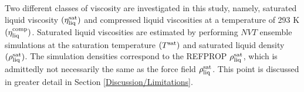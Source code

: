 \documentclass[preprint,review,12pt]{elsarticle}
\begin{document}
	
	
	
%	
	
	
		
	Two different classes of viscosity are investigated in this study, namely, saturated liquid viscosity $(\eta_{\rm liq}^{\rm sat})$ and compressed liquid viscosities at a temperature of 293 K $(\eta_{\rm liq}^{\rm comp})$. Saturated liquid viscosities are estimated by performing $NVT$ ensemble simulations at the saturation temperature $(T^{\rm sat})$ and saturated liquid density $(\rho_{\rm liq}^{\rm sat})$. The simulation densities correspond to the REFPROP $\rho_{\rm liq}^{\rm sat}$, which is admittedly not necessarily the same as the force field $\rho_{\rm liq}^{\rm sat}$. This point is discussed in greater detail in Section \ref{Discussion/Limitations}. 
	
%	
	
\end{document}
